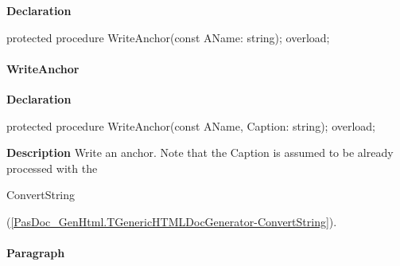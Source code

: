\documentclass{report}
\newif\ifpdf
\begin{document}
\label{PasDoc_GenHtml.TGenericHTMLDocGenerator-WriteAnchor}
\begin{list}{}{
\setlength{\itemindent}{0cm}
\setlength{\listparindent}{0cm}
\setlength{\leftmargin}{\evensidemargin}
\addtolength{\leftmargin}{\tmplength}
\settowidth{\labelsep}{X}
\addtolength{\leftmargin}{\labelsep}
\setlength{\labelwidth}{\tmplength}
}
\item[\textbf{Declaration}\hfill]
\ifpdf
\begin{flushleft}
\fi
\begin{ttfamily}
protected procedure WriteAnchor(const AName: string); overload;\end{ttfamily}

\ifpdf
\end{flushleft}
\fi

\end{list}
\paragraph*{WriteAnchor}\hspace*{\fill}

\label{PasDoc_GenHtml.TGenericHTMLDocGenerator-WriteAnchor}
\begin{list}{}{
\setlength{\itemindent}{0cm}
\setlength{\listparindent}{0cm}
\setlength{\leftmargin}{\evensidemargin}
\addtolength{\leftmargin}{\tmplength}
\settowidth{\labelsep}{X}
\addtolength{\leftmargin}{\labelsep}
\setlength{\labelwidth}{\tmplength}
}
\item[\textbf{Declaration}\hfill]
\ifpdf
\begin{flushleft}
\fi
\begin{ttfamily}
protected procedure WriteAnchor(const AName, Caption: string); overload;\end{ttfamily}

\ifpdf
\end{flushleft}
\fi

\par
\item[\textbf{Description}]
Write an anchor. Note that the Caption is assumed to be already processed with the \begin{ttfamily}ConvertString\end{ttfamily}(\ref{PasDoc_GenHtml.TGenericHTMLDocGenerator-ConvertString}).

\end{list}
\paragraph*{Paragraph}\hspace*{\fill}
\end{document}
